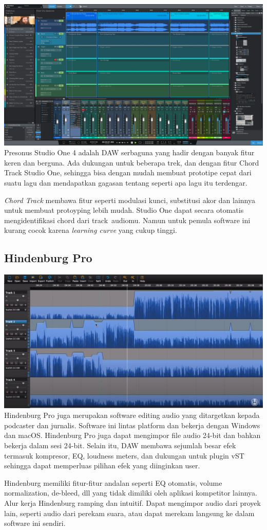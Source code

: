 \includegraphics{images/studioone.png} Presonus Studio One 4 adalah DAW
serbaguna yang hadir dengan banyak fitur keren dan berguna. Ada dukungan
untuk beberapa trek, dan dengan fitur Chord Track Studio One, sehingga
bisa dengan mudah membuat prototipe cepat dari suatu lagu dan
mendapatkan gagasan tentang seperti apa lagu itu terdengar.

\emph{Chord Track} membawa fitur seperti modulasi kunci, substitusi akor
dan lainnya untuk membuat protoyping lebih mudah. Studio One dapat
secara otomatis mengidentifikasi chord dari track~audiomu. Namun untuk
pemula software ini kurang cocok karena \emph{learning curve} yang cukup
tinggi.

\hypertarget{hindenburg-pro}{%
\subsection{Hindenburg Pro}\label{hindenburg-pro}}

\includegraphics{images/hindenburg.jpg} Hindenburg Pro juga merupakan
software editing audio yang ditargetkan kepada podcaster dan jurnalis.
Software ini lintas platform dan bekerja dengan Windows dan macOS.
Hindenburg Pro juga dapat mengimpor file audio 24-bit dan bahkan bekerja
dalam sesi 24-bit. Selain itu, DAW membawa sejumlah besar efek termasuk
kompresor, EQ, loudness meters, dan dukungan untuk plugin vST sehingga
dapat memperluas pilihan efek yang diinginkan user.

Hindenburg memiliki fitur-fitur andalan seperti EQ otomatis, volume
normalization, de-bleed, dll yang tidak dimiliki oleh aplikasi
kompetitor lainnya. Alur kerja Hindenburg ramping dan intuitif. Dapat
mengimpor audio dari proyek lain, seperti audio dari perekam suara, atau
dapat merekam langsung ke dalam software ini sendiri.
